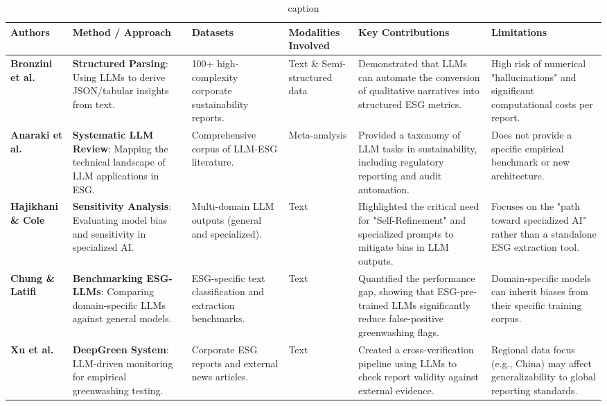 \begin{landscape}
\begin{table}[p]
\centering
\caption{caption}
\label{label}
\small
\renewcommand{\arraystretch}{1.2}
\begin{tabularx}{\linewidth}{|p{1.8cm}|p{3.5cm}|p{3.5cm}|p{1.8cm}|X|X|}
\hline
Authors & Method / Approach & Datasets & Modalities Involved & Key Contributions & Limitations \\ \hline
\textbf{Bronzini et al.}  \parencite{marco_bronzini_bf94d949} & \textbf{Structured Parsing}: Using LLMs to derive JSON/tabular insights from text. & 100+ high-complexity corporate sustainability reports. & Text \& Semi-structured data & Demonstrated that LLMs can automate the conversion of qualitative narratives into structured ESG metrics. & High risk of numerical "hallucinations" and significant computational costs per report. \\ \hline
\textbf{Anaraki et al.}  \parencite{seyed_alireza_mousavian_anaraki_b56a1c0f} & \textbf{Systematic LLM Review}: Mapping the technical landscape of LLM applications in ESG. & Comprehensive corpus of LLM-ESG literature. & Meta-analysis & Provided a taxonomy of LLM tasks in sustainability, including regulatory reporting and audit automation. & Does not provide a specific empirical benchmark or new architecture. \\ \hline
\textbf{Hajikhani \& Cole}  \parencite{arash_hajikhani_cbb2528f} & \textbf{Sensitivity Analysis}: Evaluating model bias and sensitivity in specialized AI. & Multi-domain LLM outputs (general and specialized). & Text & Highlighted the critical need for "Self-Refinement" and specialized prompts to mitigate bias in LLM outputs. & Focuses on the "path toward specialized AI" rather than a standalone ESG extraction tool. \\ \hline
\textbf{Chung \& Latifi}  \parencite{tae_sun_chung_e16a4c18} & \textbf{Benchmarking ESG-LLMs}: Comparing domain-specific LLMs against general models. & ESG-specific text classification and extraction benchmarks. & Text & Quantified the performance gap, showing that ESG-pre-trained LLMs significantly reduce false-positive greenwashing flags. & Domain-specific models can inherit biases from their specific training corpus. \\ \hline
\textbf{Xu et al.}  \parencite{chong_xu_bff21576} & \textbf{DeepGreen System}: LLM-driven monitoring for empirical greenwashing testing. & Corporate ESG reports and external news articles. & Text & Created a cross-verification pipeline using LLMs to check report validity against external evidence. & Regional data focus (e.g., China) may affect generalizability to global reporting standards. \\ \hline

\end{tabularx}
\end{table}
\end{landscape}
